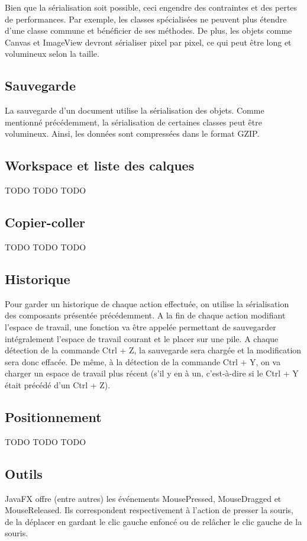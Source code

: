 

Bien que la sérialisation soit possible, ceci engendre des contraintes et des pertes de performances. Par exemple, les classes spécialisées ne peuvent plus étendre d'une classe commune et bénéficier de ses méthodes. De plus, les objets comme Canvas et ImageView devront sérialiser pixel par pixel, ce qui peut être long et volumineux selon la taille.

\subsection{Sauvegarde}
La sauvegarde d'un document utilise la sérialisation des objets. Comme mentionné précédemment, la sérialisation de certaines classes peut être volumineux. Ainsi, les données sont compressées dans le format GZIP.

\subsection{Workspace et liste des calques}
TODO TODO TODO

\subsection{Copier-coller}
TODO TODO TODO

\subsection{Historique}
Pour garder un historique de chaque action effectuée, on utilise la sérialisation des composants présentée précédemment. A la fin de chaque action modifiant l'espace de travail, une fonction va être appelée permettant de sauvegarder intégralement l'espace de travail courant et le placer sur une pile. A chaque détection de la commande Ctrl + Z, la sauvegarde sera chargée et la modification sera donc effacée. De même, à la détection de la commande Ctrl + Y, on va charger un espace de travail plus récent (s'il y en à un, c'est-à-dire si le Ctrl + Y était précédé d'un Ctrl + Z).

\subsection{Positionnement}
TODO TODO TODO

\subsection{Outils}
\par
JavaFX offre (entre autres) les événements MousePressed, MouseDragged et MouseReleased. Ils correspondent respectivement à l'action de presser la souris, de la déplacer en gardant le clic gauche enfoncé ou de relâcher le clic gauche de la souris. 
